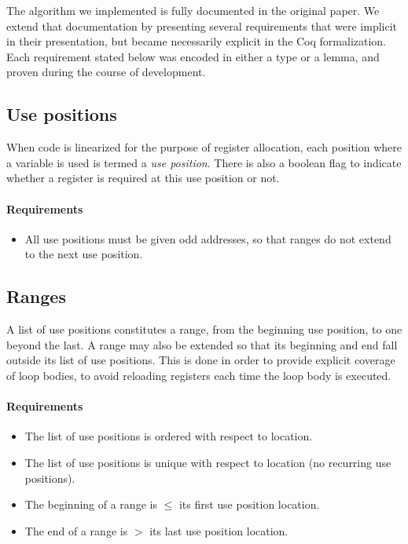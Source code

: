 \documentclass{llncs}
\begin{document}
The algorithm we implemented is fully documented in the original
paper\cite{Wimmer:2005}.  We extend that documentation by presenting several
requirements that were implicit in their presentation, but became necessarily
explicit in the Coq formalization.  Each requirement stated below was encoded
in either a type or a lemma, and proven during the course of development.

\subsection{Use positions}
\label{sec:usepos}

When code is linearized for the purpose of register allocation, each position
where a variable is used is termed a \emph{use position}.  There is also a
boolean flag to indicate whether a register is required at this use position
or not.

\paragraph{Requirements}

\begin{itemize}
\item All use positions must be given odd addresses, so that ranges do not
  extend to the next use position.
\end{itemize}

\subsection{Ranges}
\label{sec:ranges}

A list of use positions constitutes a range, from the beginning use position,
to one beyond the last.  A range may also be extended so that its beginning
and end fall outside its list of use positions.  This is done in order to
provide explicit coverage of loop bodies, to avoid reloading registers each
time the loop body is executed.

\paragraph{Requirements}

\begin{itemize}
\item The list of use positions is ordered with respect to location.
\item The list of use positions is unique with respect to location (no
  recurring use positions).
\item The beginning of a range is $\le$ its first use position location.
\item The end of a range is $>$ its last use position location.
\end{itemize}
\end{document}
